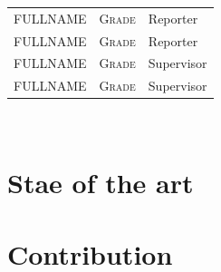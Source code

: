 \documentclass[12pt]{book}
\begin{document}
\begin{titlepage}
		
		\begin{center}
			\begin{tabular}{lll}
				 \textsc{FULLNAME}  &  \textsc{Grade} & Reporter\\
				\textsc{FULLNAME}  &  \textsc{Grade} & Reporter \\
				\textsc{FULLNAME}  &  \textsc{Grade} & Supervisor\\
				\textsc{FULLNAME}  &  \textsc{Grade} & Supervisor \\
				
			\end{tabular}\\[1cm]
		\end{center}

	\newpage
	\end{titlepage}



\pagestyle{fancy}

\fancyhead{}

\renewcommand{\chaptermark}[1]{\markboth{\textsc{#1}}{}}


\frontmatter

\tableofcontents
{}

\listoffigures
{}

\listoftables
{}


\mainmatter

\setlength{\parskip}{.7em}

\titlespacing*{\section}{0pt}{.9em}{.8em}
\renewcommand{\baselinestretch}{1.1}


\fancyhead[RO]{\leftmark}
\fancyhead[LE]{\textsc{\chaptername~\thechapter}}




\part{Stae of the art}


\part{Contribution}



\printbibliography
{}
\end{document}
